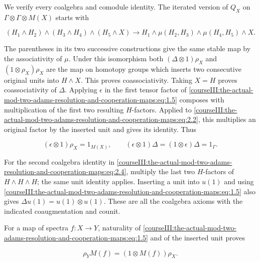 We verify every coalgebra and comodule identity. The iterated version of \(Q_X\) on
\(\Gamma\otimes\Gamma\otimes M(X)\) starts with

\begin{equation}
(H_1\wedge H_2)\wedge(H_3\wedge H_4)\wedge(H_5\wedge X)
 \longrightarrow H_1\wedge\mu(H_2,H_3)\wedge\mu(H_4,H_5)\wedge X.
 \label{courseIII:the-actual-mod-two-adams-resolution-and-cooperation-maps:eq:2.3}
\end{equation}

The parentheses in its two successive constructions give the same stable map by the associativity of \(\mu\). Under this isomorphism both
\((\Delta\otimes1)\rho_X\) and \((1\otimes\rho_X)\rho_X\) are the map on homotopy groups which inserts two consecutive original units into \(H\wedge X\). This proves coassociativity. Taking \(X=H\) proves coassociativity of \(\Delta\). Applying \(\epsilon\) in the first tensor factor of \eqref{courseIII:the-actual-mod-two-adams-resolution-and-cooperation-maps:eq:1.5} composes with multiplication of the first two resulting \(H\)-factors. Applied to \eqref{courseIII:the-actual-mod-two-adams-resolution-and-cooperation-maps:eq:2.2}, this multiplies an original factor by the inserted unit and gives its identity. Thus

\begin{equation}
(\epsilon\otimes1)\rho_X=1_{M(X)},\qquad
 (\epsilon\otimes1)\Delta=(1\otimes\epsilon)\Delta=1_\Gamma.
 \label{courseIII:the-actual-mod-two-adams-resolution-and-cooperation-maps:eq:2.4}
\end{equation}

For the second coalgebra identity in \eqref{courseIII:the-actual-mod-two-adams-resolution-and-cooperation-maps:eq:2.4}, multiply the last two \(H\)-factors of \(H\wedge H\wedge H\); the same unit identity applies. Inserting a unit into \(u(1)\) and using \eqref{courseIII:the-actual-mod-two-adams-resolution-and-cooperation-maps:eq:1.5} also gives \(\Delta u(1)=u(1)\otimes u(1)\). These are all the coalgebra axioms with the indicated coaugmentation and counit.

For a map of spectra \(f:X\to Y\), naturality of \eqref{courseIII:the-actual-mod-two-adams-resolution-and-cooperation-maps:eq:1.5} and of the inserted unit proves

\begin{equation}
\rho_YM(f)=(1\otimes M(f))\rho_X.
 \label{courseIII:the-actual-mod-two-adams-resolution-and-cooperation-maps:eq:2.5}
\end{equation}

